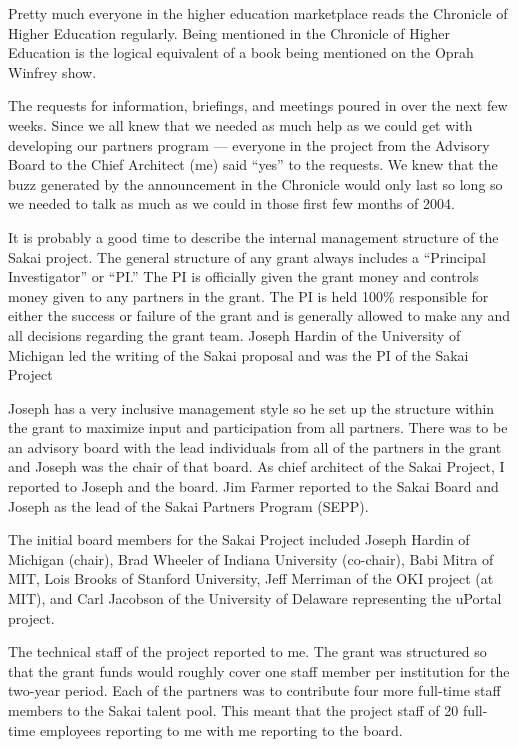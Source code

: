 \documentclass[12pt]{book}
\begin{document}
Pretty much everyone in the higher education marketplace reads the Chronicle
of Higher Education regularly.   Being mentioned in the Chronicle
of Higher Education is the logical equivalent of a book being mentioned on the
Oprah Winfrey show.

The requests for information, briefings, and meetings poured in over
the next few weeks.  Since we all knew that we needed as much help as we could get
with developing our partners program --- everyone in the project from the Advisory Board to
the Chief Architect (me) said ``yes'' to the requests.  We knew that the
buzz generated by the announcement in the Chronicle would only last so long so
we needed to talk as much as we could in those first few months of 2004.

It is probably a good time to describe the internal management structure of the
Sakai project.  The general structure of any grant always includes a
``Principal Investigator'' or ``PI.''  The PI is officially given
the grant money and controls money given to any partners in the grant.
The PI is held 100\% responsible for either the success or failure of the grant
and is generally allowed to make any and all decisions regarding the grant
team.  Joseph Hardin of the University of Michigan led the writing of
the Sakai proposal and was the PI of the Sakai Project

Joseph has a very inclusive management style so he set up the structure within the grant
to maximize input and participation from all partners.  There
was to be an advisory board with the lead individuals from all of the partners
in the grant and Joseph was the chair of that board.  As chief architect of the
Sakai Project, I reported to Joseph and the board.  Jim Farmer reported to
the Sakai Board and Joseph as the lead of the Sakai Partners Program (SEPP).

The initial board members for the Sakai Project included Joseph Hardin of
Michigan (chair), Brad Wheeler of Indiana University (co-chair), Babi
Mitra of MIT, Lois Brooks of Stanford University,
Jeff Merriman of the OKI project (at MIT), and Carl Jacobson of the University of
Delaware representing the uPortal project.


The technical staff of the project reported to me.  The grant was structured
so that the grant funds would roughly cover one staff member per institution
for the two-year period.   Each of the partners was to contribute four more full-time staff
members to the Sakai talent pool.   This meant that the project staff
of 20 full-time employees reporting to me with me reporting
to the board.
\end{document}
